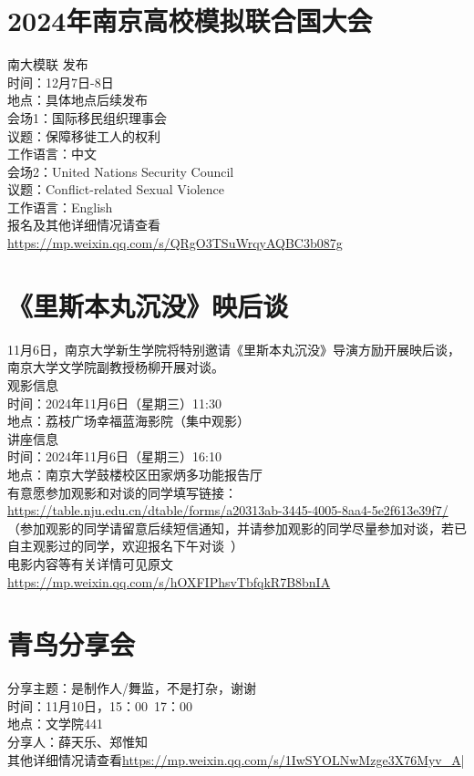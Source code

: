 \documentclass[letterpaper, 12pt]{article}
\begin{document}
\begin{multicols}{2}
\section{2024年南京高校模拟联合国大会}
南大模联 发布\\
时间：12月7日-8日\\
地点：具体地点后续发布\\
会场1：国际移民组织理事会\\
议题：保障移徙工人的权利\\
工作语言：中文\\
会场2：United Nations Security Council\\
议题：Conflict-related Sexual Violence\\
工作语言：English\\
报名及其他详细情况请查看\url{https://mp.weixin.qq.com/s/QRgO3TSuWrqyAQBC3b087g}\\
\section{《里斯本丸沉没》映后谈}
11月6日，南京大学新生学院将特别邀请《里斯本丸沉没》导演方励开展映后谈，南京大学文学院副教授杨柳开展对谈。\\
观影信息\\
时间：2024年11月6日（星期三）11:30\\
地点：荔枝广场幸福蓝海影院（集中观影）\\
讲座信息\\
时间：2024年11月6日（星期三）16:10\\
地点：南京大学鼓楼校区田家炳多功能报告厅\\
有意愿参加观影和对谈的同学填写链接：\\
\url{https://table.nju.edu.cn/dtable/forms/a20313ab-3445-4005-8aa4-5e2f613e39f7/}\\
（参加观影的同学请留意后续短信通知，并请参加观影的同学尽量参加对谈，若已自主观影过的同学，欢迎报名下午对谈~）\\
电影内容等有关详情可见原文\url{https://mp.weixin.qq.com/s/hOXFIPhsvTbfqkR7B8bnIA}\\

\section{青鸟分享会}
分享主题：是制作人/舞监，不是打杂，谢谢\\
时间：11月10日，15：00~17：00\\
地点：文学院441\\
分享人：薛天乐、郑惟知\\
其他详细情况请查看\url{https://mp.weixin.qq.com/s/1IwSYOLNwMzge3X76Myv_A}|\\


\end{multicols}
\end{document}
